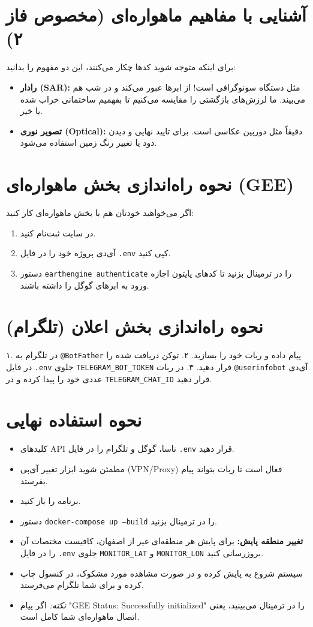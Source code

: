 \documentclass{article}
\begin{document}
\section{آشنایی با مفاهیم ماهواره‌ای (مخصوص فاز ۲)}
برای اینکه متوجه شوید کدها چکار می‌کنند، این دو مفهوم را بدانید:
\begin{itemize}
    \item \textbf{رادار (SAR):} مثل دستگاه سونوگرافی است! از ابرها عبور می‌کند و در شب هم می‌بیند. ما لرزش‌های بازگشتی را مقایسه می‌کنیم تا بفهمیم ساختمانی خراب شده یا خیر.
    \item \textbf{تصویر نوری (Optical):} دقیقاً مثل دوربین عکاسی است. برای تایید نهایی و دیدن دود یا تغییر رنگ زمین استفاده می‌شود.
\end{itemize}

\section{نحوه راه‌اندازی بخش ماهواره‌ای (GEE)}
اگر می‌خواهید خودتان هم با بخش ماهواره‌ای کار کنید:
\begin{enumerate}
    \item در سایت  ثبت‌نام کنید.
    \item آی‌دی پروژه خود را در فایل \texttt{.env} کپی کنید.
    \item دستور \texttt{earthengine authenticate} را در ترمینال بزنید تا کدهای پایتون اجازه ورود به ابرهای گوگل را داشته باشند.
\end{enumerate}

\section{نحوه راه‌اندازی بخش اعلان (تلگرام)}
۱. در تلگرام به \texttt{@BotFather} پیام داده و ربات خود را بسازید.
۲. توکن دریافت شده را در فایل \texttt{.env} جلوی \texttt{TELEGRAM_BOT_TOKEN} قرار دهید.
۳. در ربات \texttt{@userinfobot} آی‌دی عددی خود را پیدا کرده و در \texttt{TELEGRAM_CHAT_ID} قرار دهید.

\section{نحوه استفاده نهایی}
\begin{itemize}
    \item کلیدهای API ناسا، گوگل و تلگرام را در فایل \texttt{.env} قرار دهید.
    \item مطمئن شوید ابزار تغییر آی‌پی (VPN/Proxy) فعال است تا ربات بتواند پیام بفرستد.
    \item برنامه  را باز کنید.
    \item دستور \texttt{docker-compose up --build} را در ترمینال بزنید.
    \item \textbf{تغییر منطقه پایش:} برای پایش هر منطقه‌ای غیر از اصفهان، کافیست مختصات آن را در فایل \texttt{.env} جلوی \texttt{MONITOR_LAT} و \texttt{MONITOR_LON} بر‌وزرسانی کنید.
    \item سیستم شروع به پایش کرده و در صورت مشاهده مورد مشکوک، در کنسول چاپ کرده و برای شما تلگرام می‌فرستد.
    \item \textit{نکته:} اگر پیام "GEE Status: Successfully initialized" را در ترمینال می‌بینید، یعنی اتصال ماهواره‌ای شما کامل است.
\end{itemize}
\end{document}
